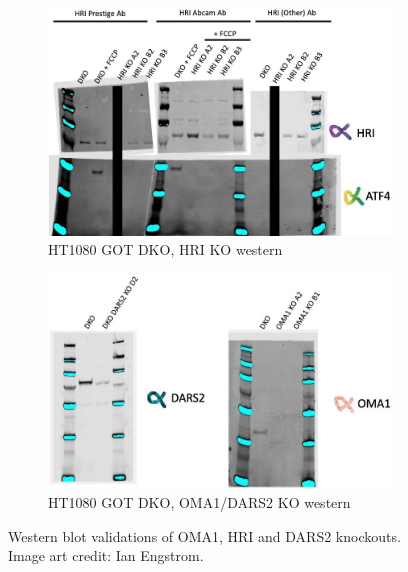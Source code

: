 \begin{figure}
     \centering
     \hspace{0.3\textwidth}
     \begin{subfigure}[b]{0.4\textwidth}
         \centering
         \includegraphics[width=\textwidth]{figures/sapp/ISR/HT1080_GOT_DKO_HRI_KO.jpeg}
         \caption{HT1080 GOT DKO, HRI KO western}
         \label{fig:sapp:ISR:HT1080_GOT_DKO_HRI_KO}
     \end{subfigure}
     \hfill
     \begin{subfigure}[b]{0.4\textwidth}
         \centering
         \includegraphics[width=\textwidth]{figures/sapp/ISR/HT1080_GOT_DKO_OMA1_DARS2_KO.jpeg}
         \caption{HT1080 GOT DKO, OMA1/DARS2 KO western}
         \label{fig:sapp:ISR:HT1080_GOT_DKO_OMA1_DARS2_KO}
     \end{subfigure}
     \hspace{0.3\textwidth}
     \hfill
        \caption[HT1080 GOT DKO, OMA1/HRI/DARS2 KO validation]{
        Western blot validations of OMA1, HRI and DARS2 knockouts.
        Image art credit: Ian Engstrom.
        }
        \label{fig:sapp:ISR:OMA1_HRI_DARS2_val}
\end{figure}









